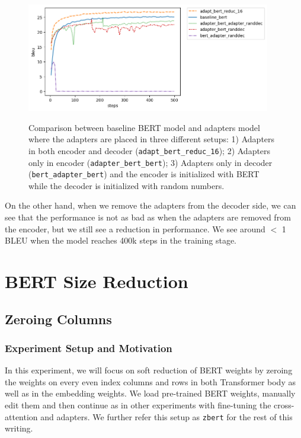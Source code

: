 \begin{figure}[h]
    {\includegraphics[width=0.95\textwidth]{img/adapter_bert_randdec.png}}
    \centering
    \caption[Comparison for model with adapters in the decoder and the decoder is initalized with random weights]{Comparison between baseline BERT model and adapters model where the adapters are placed in three different setups: 1) Adapters in both encoder and decoder (\texttt{adapt\_bert\_reduc\_16}); 2) Adapters only in encoder (\texttt{adapter\_bert\_bert}); 3) Adapters only in decoder (\texttt{bert\_adapter\_bert}) and the encoder is initialized with BERT while the decoder is initialized with random numbers.}
    \label{img:adapt_bert_randdec}
\end{figure}

On the other hand, when we remove the adapters from the decoder side, we can see that the performance is not as bad as when the adapters are removed from the encoder, but we still see a reduction in performance. We see around $<$ 1 BLEU when the model reaches 400k steps in the training stage.

\section{BERT Size Reduction}
\subsection{Zeroing Columns}
\subsubsection{Experiment Setup and Motivation}
In this experiment, we will focus on soft reduction of BERT weights by zeroing the weights on every even index columns and rows in both Transformer body as well as in the embedding weights. We load pre-trained BERT weights, manually edit them and then continue as in other experiments with fine-tuning the cross-attention and adapters. We further refer this setup as \texttt{zbert} for the rest of this writing.

